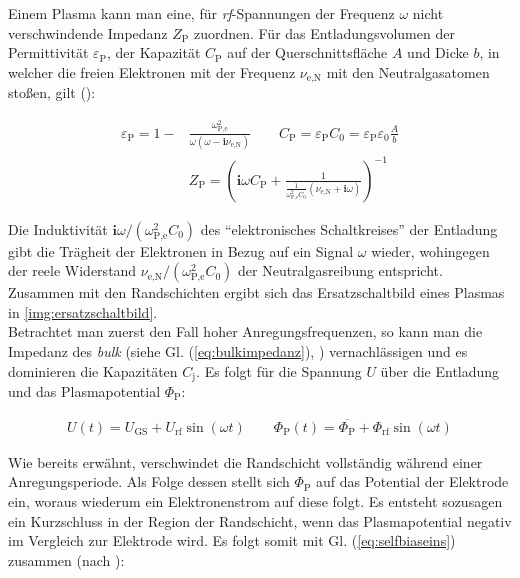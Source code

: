 \documentclass[numbers=noenddot,a4paper]{scrartcl}
\newcommand{\ix}[1]{_\text{#1}}
\newcommand{\imag}{\mathbf{i}}
\newcommand{\tilt}[1]{\textit{#1}}
\begin{document}
					Einem Plasma kann man eine, für \tilt{rf}-Spannungen der Frequenz $\omega$ nicht verschwindende Impedanz $Z\ix{P}$ zuordnen. Für das Entladungsvolumen der Permittivität $\varepsilon\ix{P}$, der Kapazität $C\ix{P}$ auf der Querschnittsfläche $A$ und Dicke $b$, in welcher die freien Elektronen mit der Frequenz $\nu\ix{e,N}$ mit den Neutralgasatomen stoßen, gilt (\cite{Piel10}):

					\begin{align}
					\varepsilon\ix{P}=1-&\frac{\omega\ix{P,e}^2}{\omega\left(\omega-\imag\nu\ix{e,N}\right)} \quad \quad C\ix{P}=\varepsilon\ix{P}C\ix{0}=\varepsilon\ix{P}\varepsilon\ix{0}\frac{A}{b} \\
					&Z\ix{P}=\left(\imag\omega C\ix{P}+ \frac{1}{\frac{1}{\omega\ix{P,e}^2C\ix{0}}\left(\nu\ix{e,N}+\imag\omega\right)}\right)^{-1}
					\label{eq:bulkimpedanz}
					\end{align}

					Die Induktivität $\imag\omega/\left(\omega\ix{P,e}^2C\ix{0}\right)$ des "`elektronisches Schaltkreises"' der Entladung gibt die Trägheit der Elektronen in Bezug auf ein Signal $\omega$ wieder, wohingegen der reele Widerstand $\nu\ix{e,N}/\left(\omega\ix{P,e}^2C\ix{0}\right)$ der Neutralgasreibung entspricht. Zusammen mit den Randschichten ergibt sich das Ersatzschaltbild eines Plasmas in \ref{img:ersatzschaltbild}.\\
					Betrachtet man zuerst den Fall hoher Anregungsfrequenzen, so kann man die Impedanz des \tilt{bulk} (siehe Gl. (\ref{eq:bulkimpedanz}), \cite{Kay85}) vernachlässigen und es dominieren die Kapazitäten $C\ix{j}$. Es folgt für die Spannung $U$ über die Entladung und das Plasmapotential $\Phi\ix{P}$:

						\begin{align}
							U\left(t\right)=U\ix{GS}+U\ix{rf}\sin\left(\omega t\right) \quad \quad \Phi\ix{P}\left(t\right)=\overline{\Phi\ix{P}}+\Phi\ix{rf}\sin\left(\omega t\right) \label{eq:selfbiaseins}
						\end{align}

					Wie bereits erwähnt, verschwindet die Randschicht vollständig während einer Anregungsperiode. Als Folge dessen stellt sich $\Phi\ix{P}$ auf das Potential der Elektrode ein, woraus wiederum ein Elektronenstrom auf diese folgt. Es entsteht sozusagen ein Kurzschluss in der Region der Randschicht, wenn das Plasmapotential negativ im Vergleich zur Elektrode wird. Es folgt somit mit Gl. (\ref{eq:selfbiaseins}) zusammen (nach \cite{Piel10}):
\end{document}
